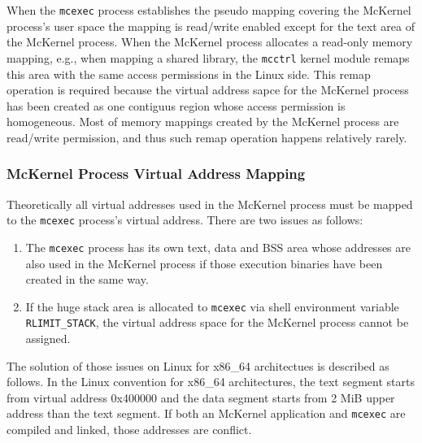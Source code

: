 \documentclass[twoside,11pt,fleqn]{book}
\newcounter{subsubsubsection}[subsubsection]
\begin{document}
When the \texttt{mcexec} process establishes the pseudo mapping covering
the McKernel process's user space the mapping is read/write enabled
except for the text area of the McKernel process.
When the McKernel process allocates a read-only memory mapping,
e.g., when mapping a shared library,
the \texttt{mcctrl} kernel module remaps this area with the same
access permissions in the Linux side.
This remap operation is required because the virtual address sapce
for the McKernel process has been created as one contiguus region
whose access permission is homogeneous.
Most of memory mappings created by the McKernel process are
read/write permission, and thus such remap operation happens
relatively rarely.


\subsubsection{McKernel Process Virtual Address Mapping}
Theoretically all virtual addresses used in the McKernel process must be
mapped to the \texttt{mcexec} process's virtual address.
There are two issues as follows:

\begin{enumerate}
\item The \texttt{mcexec} process has its own text, data and BSS area
whose addresses are also used in the McKernel process if those execution
binaries have been created in the same way.
\item If the huge stack area is allocated to \texttt{mcexec} via shell environment
variable \texttt{RLIMIT\_STACK}, the virtual address space for the McKernel
process cannot be assigned.
\end{enumerate}

The solution of those issues on Linux for x86\_64 architectues is
described as follows.
In the Linux convention for x86\_64 architectures,
the text segment starts from virtual address 0x400000 and
the data segment starts from 2 MiB upper address than the text segment.
If both an McKernel application and \texttt{mcexec} are compiled and linked,
those addresses are conflict.
\end{document}
